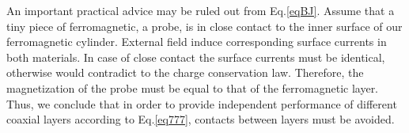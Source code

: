 \documentclass[12pt]{article}
\begin{document}
An important practical advice may be ruled out   from   Eq.\ref{eqBJ}.
Assume  that  a  tiny piece of ferromagnetic, a probe, is in close contact to the inner
surface of our  ferromagnetic cylinder.  External field induce 
corresponding surface currents in both materials.
In  case of close contact  the  surface currents must  be  identical, 
otherwise   would  contradict  to the charge  conservation law. Therefore,  
the  magnetization of the probe must  be  equal to that of the  
ferromagnetic layer.
Thus, we  conclude  that  in order to provide  independent performance of 
different coaxial layers according to Eq.\ref{eq777}, contacts between  
layers must  be avoided.






\end{document}
